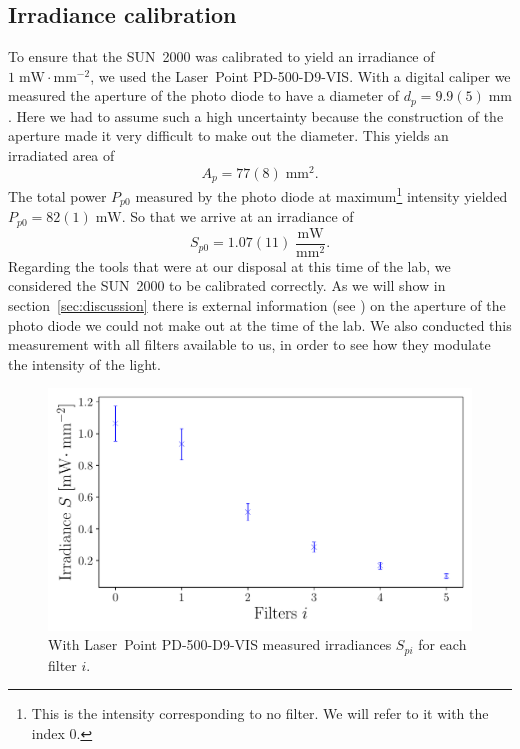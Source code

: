 \documentclass[a4paper,10pt,twocolumn]{article}
\begin{document}
\begin{extract*}
\subsection{Irradiance calibration}
To ensure that the SUN~2000 was calibrated to yield an irradiance of $1\;\text{mW}\!\cdot\text{mm}^{-2}$, we used the Laser~Point PD-500-D9-VIS. With a digital caliper we measured the aperture of the photo diode to have a diameter of $d_p = 9.9(5)\;\text{mm}$. Here we had to assume such a high uncertainty because the construction of the aperture made it very difficult to make out the diameter. This yields an irradiated area of
\begin{equation*}
	A_p =  77(8)\;\text{mm}^2.
\end{equation*}
The total power $P_{p0}$ measured by the photo diode at maximum\footnote{This is the intensity corresponding to no filter. We will refer to it with the index 0.} intensity yielded $P_{p0} = 82(1)\;\text{mW}$. So that we arrive at an irradiance of
\begin{equation*}
	S_{p0} = 1.07(11)\;\frac{\text{mW}}{\text{mm}^2}.
\end{equation*}
Regarding the tools that were at our disposal at this time of the lab, we considered the SUN~2000 to be calibrated correctly. As we will show in section~\ref{sec:discussion} there is external information (see \cite{photodiode}) on the aperture of the photo diode we could not make out at the time of the lab.\mypar
We also conducted this measurement with all filters available to us, in order to see how they modulate the intensity of the light.
\begin{figure}[h]
	\includegraphics[scale=0.5]{../2_Pictures/Photodiode_irradiance.pdf}
	\caption{With Laser~Point PD-500-D9-VIS measured irradiances $S_{pi}$ for each filter $i$.}
	\label{fig:photodiode_irradiances}
\end{figure}


\end{extract*}
\end{document}
